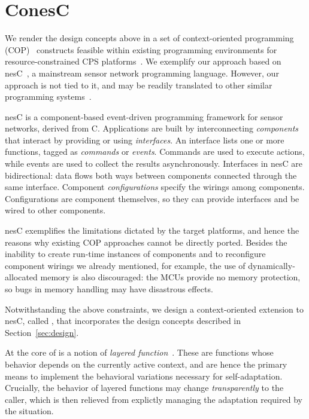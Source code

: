 
\section{ConesC}
\label{sec:conesc}

We render the design concepts above in a set of context-oriented
programming (COP)~\cite{Hirschfeld08} constructs feasible within
existing programming environments for resource-constrained CPS
platforms~\cite{mottola10:survey}.  We exemplify our approach based on
nesC~\cite{gay03nesc}, a mainstream sensor network programming
language. However, our approach is not tied to it, and may be readily
translated to other similar programming systems~\cite{mottola10:survey}.

 nesC is a component-based event-driven
programming framework for sensor networks, derived from
C. Applications are built by interconnecting \emph{components} that
interact by providing or using \emph{interfaces}. An interface lists
one or more functions, tagged as \emph{commands} or
\emph{events}. Commands are used to execute actions, while events are
used to collect the results asynchronously.  Interfaces in nesC are
bidirectional: data flows both ways between components connected
through the same interface.  Component \emph{configurations} specify
the wirings among components. Configurations are component themselves,
so they can provide interfaces and be wired to other components.

nesC exemplifies the limitations dictated by the target platforms, and
hence the reasons why existing COP approaches cannot be directly
ported. Besides the inability to create run-time instances of
components and to reconfigure component wirings we already mentioned,
for example, the use of dynamically-allocated memory is also
discouraged: the MCUs provide no memory protection, so bugs in memory
handling may have disastrous effects.

\fakepar{\conesc} Notwithstanding the above constraints, we design a
context-oriented extension to nesC, called \conesc, that incorporates
the design concepts described in Section~\ref{sec:design}. 

At the core of \conesc is a notion of \emph{layered
  function}~\cite{Hirschfeld08}. These are functions whose behavior
depends on the currently active context, and are hence the primary
means to implement the behavioral variations necessary for
self-adaptation. Crucially, the behavior of layered functions may
change \emph{transparently} to the caller, which is then relieved from
explictly managing the adaptation required by the situation.


